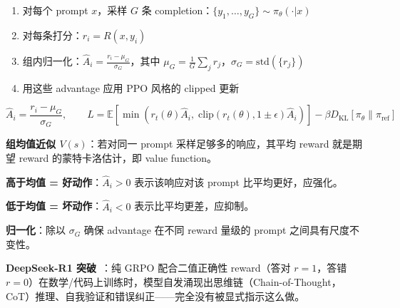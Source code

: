 \begin{enumerate}
  \item 对每个 prompt $x$，采样 $G$ 条 completion：$\{y_1, \ldots, y_G\} \sim \pi_\theta(\cdot|x)$
  \item 对每条打分：$r_i = R(x, y_i)$
  \item 组内归一化：$\hat{A}_i = \frac{r_i - \mu_G}{\sigma_G}$，其中 $\mu_G = \frac{1}{G}\sum_j r_j$，$\sigma_G = \text{std}(\{r_j\})$
  \item 用这些 advantage 应用 PPO 风格的 clipped 更新
\end{enumerate}

\begin{equation}
\boxed{\hat{A}_i = \frac{r_i - \mu_G}{\sigma_G}, \qquad L = \mathbb{E}\left[\min\left(r_t(\theta)\hat{A}_i,\; \text{clip}(r_t(\theta), 1{\pm}\epsilon)\hat{A}_i\right)\right] - \beta D_\text{KL}[\pi_\theta\|\pi_\text{ref}]}
\end{equation}

\begin{intuitionbox}[为什么组内归一化有效]
\textbf{组均值近似 $V(s)$}：若对同一 prompt 采样足够多的响应，其平均 reward 就是期望 reward 的蒙特卡洛估计，即 value function。

\textbf{高于均值 = 好动作}：$\hat{A}_i > 0$ 表示该响应对该 prompt 比平均更好，应强化。

\textbf{低于均值 = 坏动作}：$\hat{A}_i < 0$ 表示比平均更差，应抑制。

\textbf{归一化}：除以 $\sigma_G$ 确保 advantage 在不同 reward 量级的 prompt 之间具有尺度不变性。

\textbf{DeepSeek-R1 突破}~\cite{deepseek2025r1}：纯 GRPO 配合二值正确性 reward（答对 $r=1$，答错 $r=0$）在数学/代码上训练时，模型自发涌现出思维链（Chain-of-Thought，CoT）推理、自我验证和错误纠正——完全没有被显式指示这么做。
\end{intuitionbox}

